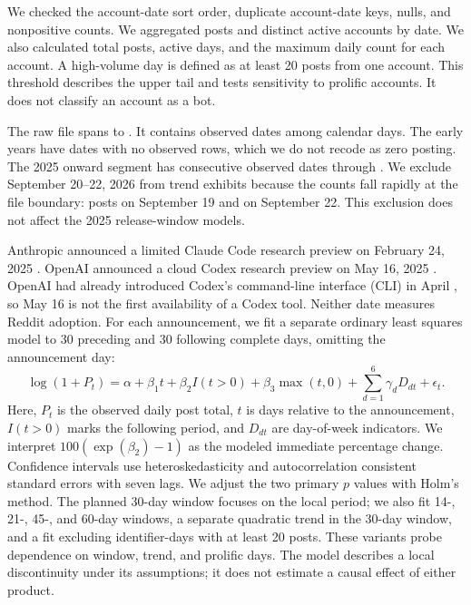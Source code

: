 \documentclass[11pt]{article}
\begin{document}
We checked the account-date sort order, duplicate account-date keys, nulls, and nonpositive counts. We aggregated posts and distinct active accounts by date. We also calculated total posts, active days, and the maximum daily count for each account. A high-volume day is defined as at least 20 posts from one account. This threshold describes the upper tail and tests sensitivity to prolific accounts. It does not classify an account as a bot.

The raw file spans \dataFirstDate{} to \dataLastRawDate{}. It contains \dataObservedDates{} observed dates among \dataCalendarDays{} calendar days. The early years have dates with no observed rows, which we do not recode as zero posting. The 2025 onward segment has \dataRecentDates{} consecutive observed dates through \dataAnalysisEnd{}. We exclude September 20--22, 2026 from trend exhibits because the counts fall rapidly at the file boundary: \dataLastStablePosts{} posts on September 19 and \dataLastDayPosts{} on September 22. This exclusion does not affect the 2025 release-window models.

Anthropic announced a limited Claude Code research preview on February 24, 2025 \cite{anthropic2025}. OpenAI announced a cloud Codex research preview on May 16, 2025 \cite{openai2025}. OpenAI had already introduced Codex's command-line interface (CLI) in April \cite{openaiCli2025}, so May 16 is not the first availability of a Codex tool. Neither date measures Reddit adoption. For each announcement, we fit a separate ordinary least squares model to 30 preceding and 30 following complete days, omitting the announcement day:
\[
\log(1+P_t)=\alpha+\beta_1 t+\beta_2 I(t>0)+\beta_3\max(t,0)+\sum_{d=1}^{6}\gamma_d D_{dt}+\epsilon_t.
\]
Here, $P_t$ is the observed daily post total, $t$ is days relative to the announcement, $I(t>0)$ marks the following period, and $D_{dt}$ are day-of-week indicators. We interpret $100(\exp(\beta_2)-1)$ as the modeled immediate percentage change. Confidence intervals use heteroskedasticity and autocorrelation consistent standard errors with seven lags. We adjust the two primary $p$ values with Holm's method. The planned 30-day window focuses on the local period; we also fit 14-, 21-, 45-, and 60-day windows, a separate quadratic trend in the 30-day window, and a fit excluding identifier-days with at least 20 posts. These variants probe dependence on window, trend, and prolific days. The model describes a local discontinuity under its assumptions; it does not estimate a causal effect of either product.
\end{document}
